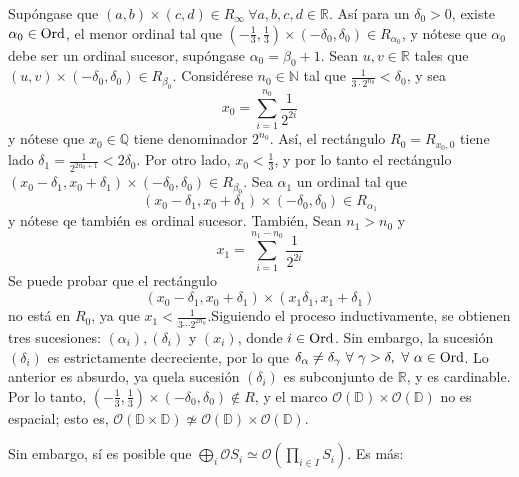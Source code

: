 \begin{example}
Supóngase que $(a,b)\times(c,d)\in R_\infty \ \forall a,b,c,d\in \mathbb{R}$. Así para un $\delta_0>0$, existe $\alpha_0\in\mathrm{Ord}$, el menor ordinal tal que $(-\tfrac{1}{3},\tfrac{1}{3})\times(-\delta_0,\delta_0)\in R_{\alpha_0}$, y nótese que $\alpha_0$ debe ser un ordinal sucesor, supóngase $\alpha_0=\beta_0+1$. Sean $u,v\in\mathbb{R}$ tales que $(u,v)\times(-\delta_0,\delta_0)\in R_{\beta_0}$. Considérese $n_0\in\mathbb{N}$ tal que $\frac{1}{3\cdot 2^{n_0}}<\delta_0$, y sea 
$$x_0=\sum\limits_{i=1}^{n_0}\frac{1}{2^{2i}}$$
y nótese que $x_0\in\mathbb{Q}$ tiene denominador $2^{n_0}$. Así, el rectángulo $R_0=R_{x_0,0}$ tiene lado $\delta_1=\tfrac{1}{2^{2n_0+1}}<2\delta_0$. Por otro lado, $x_0<\tfrac{1}{3}$, y por lo tanto el rectángulo $(x_0-\delta_1,x_0+\delta_1)\times(-\delta_0,\delta_0)\in R_{\beta_0}$.
Sea $\alpha_1$ un ordinal tal que 
$$(x_0-\delta_1,x_0+\delta_1)\times(-\delta_0,\delta_0)\in R_{\alpha_1}$$
y nótese qe también es ordinal sucesor. También,  Sean $n_1>n_0$ y   
$$x_1=\sum\limits_{i=1}^{n_1-n_0}\frac{1}{2^{2i}}$$
Se puede probar que el rectángulo
$$(x_0-\delta_1,x_0+\delta_1)\times(x_1\delta_1,x_1+\delta_1)$$
no está en $R_0$, ya que $x_1<\frac{1}{3\cdots 2^{2n_0}}$.Siguiendo el proceso inductivamente, se obtienen tres sucesiones: $(\alpha_i), (\delta_i)$ y $(x_i)$, donde $i\in \mathrm{Ord}$. Sin embargo, la sucesión $(\delta_i)$ es estrictamente decreciente, por lo que $\delta_\alpha\neq\delta_{\gamma} \ \forall \ \gamma>\delta,  \ \forall \ \alpha\in\Ord$. Lo anterior es absurdo, ya quela sucesión $(\delta_i)$ es subconjunto de $\mathbb{R}$, y es cardinable. Por lo tanto, $(-\frac{1}{3}, \frac{1}{3})\times (-\delta_0,\delta_0)\notin R$, y el marco $\mathcal{O}(\mathbb{D})\times\mathcal{O}(\mathbb{D})$ no es espacial; esto es, 
$\mathcal{O}(\mathbb{D}\times\mathbb{D})\not\simeq\mathcal{O}(\mathbb{D})\times\mathcal{O}(\mathbb{D})$.
\end{example}

Sin embargo, sí es posible que $\bigoplus\limits_{i}\mathcal{O}S_i\simeq\mathcal{O}(\prod\limits_{i\in I}S_i)$. Es más:

